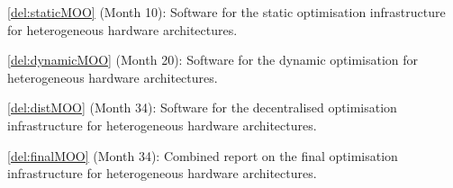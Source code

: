 \begin{Workpackage}{\thewpno}
\begin{Task}

\end{Task}


\vspace{-10pt}
\begin{WPDeliverables}

 \begin{compactitem}

 \item \ref{del:staticMOO} (Month 10): Software for the static optimisation infrastructure for heterogeneous hardware architectures.

 \item \ref{del:dynamicMOO} (Month 20): Software for the dynamic optimisation for heterogeneous hardware architectures.

 \item \ref{del:distMOO} (Month 34): Software for the decentralised optimisation infrastructure for heterogeneous hardware architectures.

 \item \ref{del:finalMOO} (Month 34): Combined report on the final optimisation infrastructure for heterogeneous hardware architectures.
 
 \end{compactitem}

\end{WPDeliverables}
\end{Workpackage}
